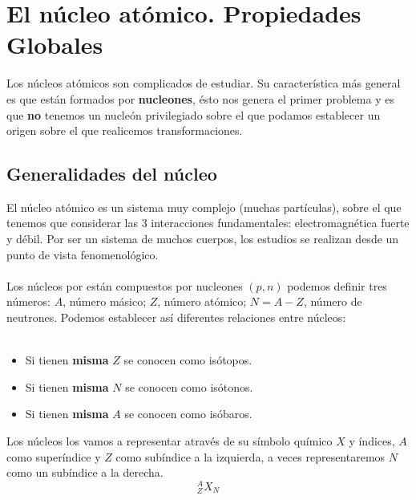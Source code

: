\pagestyle{fancy}
\chapter{El núcleo atómico. Propiedades Globales}
Los núcleos atómicos son complicados de estudiar. Su característica más general es que están formados por \textbf{nucleones}, ésto nos genera el primer problema y es que \textbf{no} tenemos un nucleón privilegiado sobre el que podamos establecer un origen sobre el que realicemos transformaciones.
\section{Generalidades del núcleo}
El núcleo atómico es un sistema muy complejo (muchas partículas), sobre el que tenemos que considerar las 3 interacciones fundamentales: electromagnética fuerte y débil. Por ser un sistema de muchos cuerpos, los estudios se realizan desde un punto de vista fenomenológico.\\\\
Los núcleos por están compuestos por nucleones $(p,n)$ podemos definir tres números: $A$, número másico; $Z$, número atómico; $N=A-Z$, número de neutrones. Podemos establecer así diferentes relaciones entre núcleos:\\\\
\noindent
\begin{minipage}{0.4\textwidth}
    \begin{itemize}
    \item Si tienen \textbf{misma} $Z$ se conocen como isótopos.
    \item Si tienen \textbf{misma} $N$ se conocen como isótonos.
    \item Si tienen \textbf{misma} $A$ se conocen como isóbaros.
\end{itemize}
\end{minipage}
\hfill
\begin{minipage}{0.55\textwidth}
    \begin{tcolorbox}[colback=amber!20, colframe=amber, title={Notación: Representación de los núcleos}]
    Los núcleos los vamos a representar através de su símbolo químico $X$ y índices, $A$ como superíndice y $Z$ como subíndice a la izquierda, a veces representaremos $N$ como un subíndice a la derecha.
    \begin{equation}
        ^A_ZX_N
    \end{equation}
\end{tcolorbox}
\end{minipage}\\\\


